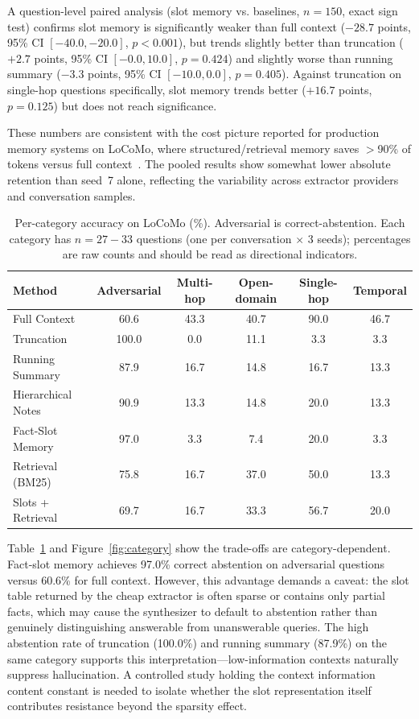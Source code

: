 \documentclass[conference]{IEEEtran}
\begin{document}
A question-level paired analysis (slot memory vs. baselines, $n=150$, exact sign
test) confirms slot memory is significantly weaker than full context ($-28.7$
points, 95\% CI $[-40.0, -20.0]$, $p<0.001$), but trends slightly better than
truncation ($+2.7$ points, 95\% CI $[-0.0, 10.0]$, $p=0.424$) and slightly worse
than running summary ($-3.3$ points, 95\% CI $[-10.0, 0.0]$, $p=0.405$). Against
truncation on single-hop questions specifically, slot memory trends better
($+16.7$ points, $p=0.125$) but does not reach significance.

These numbers are consistent with the cost picture reported for production memory
systems on LoCoMo, where structured/retrieval memory saves $>$90\% of tokens
versus full context~\cite{chhikara2025mem0}. The pooled results show somewhat
lower absolute retention than seed~7 alone, reflecting the variability across
extractor providers and conversation samples.

\begin{table}[h]
\centering
\caption{Per-category accuracy on LoCoMo (\%). Adversarial is correct-abstention. Each category has $n{=}27{-}33$ questions (one per conversation $\times$ 3 seeds); percentages are raw counts and should be read as directional indicators.}
\label{tab:category}
\scriptsize
\setlength{\tabcolsep}{2.5pt}
\begin{tabular}{lccccc}
\toprule
\textbf{Method} & \textbf{Adversarial} & \textbf{Multi-hop} & \textbf{Open-domain} & \textbf{Single-hop} & \textbf{Temporal} \\
\midrule
Full Context & 60.6 & 43.3 & 40.7 & 90.0 & 46.7 \\
Truncation & 100.0 & 0.0 & 11.1 & 3.3 & 3.3 \\
Running Summary & 87.9 & 16.7 & 14.8 & 16.7 & 13.3 \\
Hierarchical Notes & 90.9 & 13.3 & 14.8 & 20.0 & 13.3 \\
Fact-Slot Memory & 97.0 & 3.3 & 7.4 & 20.0 & 3.3 \\
Retrieval (BM25) & 75.8 & 16.7 & 37.0 & 50.0 & 13.3 \\
Slots + Retrieval & 69.7 & 16.7 & 33.3 & 56.7 & 20.0 \\
\bottomrule
\end{tabular}
\end{table}

Table~\ref{tab:category} and Figure~\ref{fig:category} show the trade-offs are
category-dependent. Fact-slot memory achieves 97.0\% correct abstention on
adversarial questions versus 60.6\% for full context. However, this advantage
demands a caveat: the slot table returned by the cheap extractor is often sparse
or contains only partial facts, which may cause the synthesizer to default to
abstention rather than genuinely distinguishing answerable from unanswerable
queries. The high abstention rate of truncation (100.0\%) and running summary
(87.9\%) on the same category supports this interpretation---low-information
contexts naturally suppress hallucination. A controlled study holding the
context information content constant is needed to isolate whether the slot
representation itself contributes resistance beyond the sparsity effect.
\end{document}
